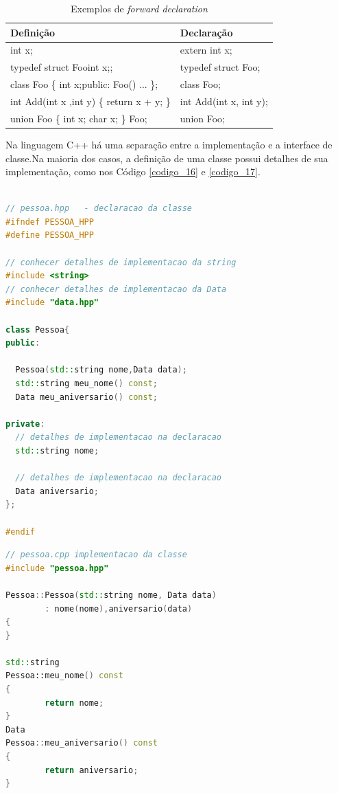 \begin{table}[!ht]
    \centering
    \caption{Exemplos de \textit{forward declaration}}
    \label{tab:tabela_03}
    \begin{tabular}{>{\ttfamily}l>{\ttfamily}l}
    \toprule
    \textbf{Definição} & \textbf{Declaração} \\
    \midrule
    int x; & extern int x;\\
    \rowcolor[gray]{0.9}
    typedef struct Foo{int x;}; & typedef struct Foo;\\
    class Foo \{ int x;public: Foo() ... \}; & class Foo;\\
    \rowcolor[gray]{0.9}
    int Add(int x ,int  y) \{ return x + y; \} & int Add(int x, int y);\\
    union Foo \{ int x; char x; \} Foo; & union Foo;\\
    \bottomrule
    \end{tabular}
\end{table}


Na linguagem C++ há uma separação entre  a implementação e a interface de
 classe\cite{ref44}.Na maioria dos casos, a definição de uma classe possui
 detalhes de sua implementação, como nos Código \ref{codigo_16} e \ref{codigo_17}.


\begin{lstlisting}[language=C++,frame=single,captionpos=b,caption={ 
                          Arquivo declaração da classe Pessoa },
                                                label=codigo_16]

// pessoa.hpp   - declaracao da classe
#ifndef PESSOA_HPP
#define PESSOA_HPP

// conhecer detalhes de implementacao da string
#include <string>       
// conhecer detalhes de implementacao da Data
#include "data.hpp"     

class Pessoa{
public:

  Pessoa(std::string nome,Data data);
  std::string meu_nome() const;
  Data meu_aniversario() const;

private:
  // detalhes de implementacao na declaracao
  std::string nome;        

  // detalhes de implementacao na declaracao
  Data aniversario;        
};

#endif

\end{lstlisting}

\begin{lstlisting}[language=C++,frame=single,captionpos=b,caption={
                               Arquivo definição da classe Pessoa},
                                                    label=codigo_17]
// pessoa.cpp implementacao da classe
#include "pessoa.hpp"

Pessoa::Pessoa(std::string nome, Data data)
        : nome(nome),aniversario(data)
{
}

std::string
Pessoa::meu_nome() const
{
        return nome;
}
Data
Pessoa::meu_aniversario() const
{
        return aniversario;
}

\end{lstlisting}    


